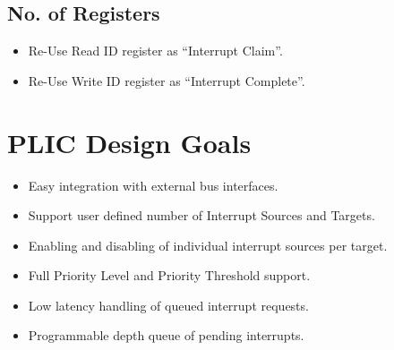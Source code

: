 \subsection{No. of Registers}
\maketitle
\begin{itemize}
    \item Re-Use Read ID register as “Interrupt Claim”.
\item  Re-Use Write ID register as “Interrupt Complete”.

\end{itemize}

\section{PLIC Design Goals}


\maketitle
\begin{itemize}
    \item Easy integration with external 
bus interfaces.
\item  Support user defined number 
of Interrupt Sources and 
Targets.
\item Enabling and disabling of 
individual interrupt sources per 
target.
\item Full Priority Level and Priority 
Threshold support.
\item  Low latency handling of 
queued interrupt requests.

\item Programmable depth queue of 
pending interrupts.

\end{itemize}


